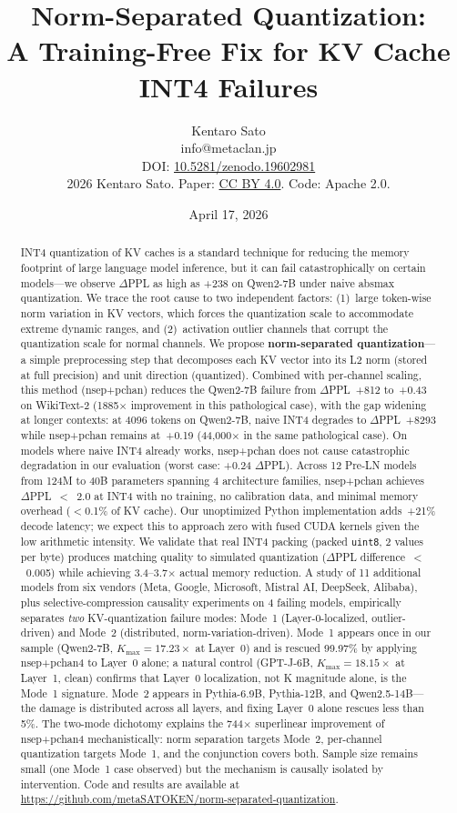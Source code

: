 \documentclass[11pt]{article}
\title{Norm-Separated Quantization:\\A Training-Free Fix for KV Cache INT4 Failures}
\author{Kentaro Sato\\info@metaclan.jp\\[4pt]{\small DOI: \href{https://doi.org/10.5281/zenodo.19602981}{10.5281/zenodo.19602981}}\\[2pt]{\small \textcopyright{} 2026 Kentaro Sato. Paper: \href{https://creativecommons.org/licenses/by/4.0/}{CC BY 4.0}. Code: Apache 2.0.}}
\date{April 17, 2026}
\begin{document}
\maketitle

\begin{abstract}
INT4 quantization of KV caches is a standard technique for reducing the memory footprint of large language model inference, but it can fail catastrophically on certain models---we observe $\Delta$PPL as high as +238 on Qwen2-7B under naive absmax quantization. We trace the root cause to two independent factors: (1)~large token-wise norm variation in KV vectors, which forces the quantization scale to accommodate extreme dynamic ranges, and (2)~activation outlier channels that corrupt the quantization scale for normal channels. We propose \textbf{norm-separated quantization}---a simple preprocessing step that decomposes each KV vector into its L2 norm (stored at full precision) and unit direction (quantized). Combined with per-channel scaling, this method (nsep+pchan) reduces the Qwen2-7B failure from $\Delta$PPL~+812 to~+0.43 on WikiText-2 (1885$\times$ improvement in this pathological case), with the gap widening at longer contexts: at 4096 tokens on Qwen2-7B, naive INT4 degrades to $\Delta$PPL~+8293 while nsep+pchan remains at~+0.19 (44{,}000$\times$ in the same pathological case). On models where naive INT4 already works, nsep+pchan does not cause catastrophic degradation in our evaluation (worst case: +0.24 $\Delta$PPL). Across 12 Pre-LN models from 124M to 40B parameters spanning 4 architecture families, nsep+pchan achieves $\Delta$PPL~$<$~2.0 at INT4 with no training, no calibration data, and minimal memory overhead ($<$0.1\% of KV cache). Our unoptimized Python implementation adds~+21\% decode latency; we expect this to approach zero with fused CUDA kernels given the low arithmetic intensity. We validate that real INT4 packing (packed \texttt{uint8}, 2 values per byte) produces matching quality to simulated quantization ($\Delta$PPL difference~$<$~0.005) while achieving 3.4--3.7$\times$ actual memory reduction. A study of 11 additional models from six vendors (Meta, Google, Microsoft, Mistral AI, DeepSeek, Alibaba), plus selective-compression causality experiments on 4 failing models, empirically separates \emph{two} KV-quantization failure modes: Mode~1 (Layer-0-localized, outlier-driven) and Mode~2 (distributed, norm-variation-driven). Mode~1 appears once in our sample (Qwen2-7B, $K_{\max}=17.23\times$ at Layer~0) and is rescued 99.97\% by applying nsep+pchan4 to Layer~0 alone; a natural control (GPT-J-6B, $K_{\max}=18.15\times$ at Layer~1, clean) confirms that Layer~0 localization, not K magnitude alone, is the Mode~1 signature. Mode~2 appears in Pythia-6.9B, Pythia-12B, and Qwen2.5-14B---the damage is distributed across all layers, and fixing Layer~0 alone rescues less than 5\%. The two-mode dichotomy explains the 744$\times$ superlinear improvement of nsep+pchan4 mechanistically: norm separation targets Mode~2, per-channel quantization targets Mode~1, and the conjunction covers both. Sample size remains small (one Mode~1 case observed) but the mechanism is causally isolated by intervention. Code and results are available at \url{https://github.com/metaSATOKEN/norm-separated-quantization}.

\end{abstract}
\end{document}
